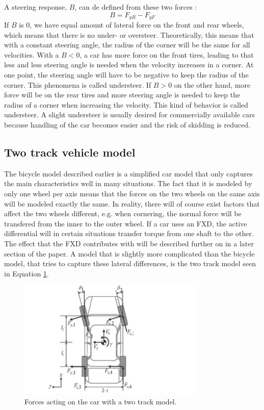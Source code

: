 A steering response, $ B $, can de defined from these two forces \cite{fordonsdynamik99}:
\begin{equation}
	B = F_{yR} - F_{yF}
\end{equation}
If $ B $ is 0, we have equal amount of lateral force on the front and rear wheels, which means that there is no under- or oversteer. Theoretically, this means that with a constant steering angle, the radius of the corner will be the same for all velocities. With a $ B < 0 $, a car has more force on the front tires, leading to that less and less steering angle is needed when the velocity increases in a corner. At one point, the steering angle will have to be negative to keep the radius of the corner. This phenomena is called understeer. If $ B > 0 $ on the other hand, more force will be on the rear tires and more steering angle is needed to keep the radius of a corner when increasing the velocity. This kind of behavior is called understeer. A slight understeer is usually desired for commercially available cars because handling of the car becomes easier and the risk of skidding is reduced.

\subsection{Two track vehicle model}

The bicycle model described earlier is a simplified car model that only captures the main characteristics well in many situations. The fact that it is modeled by only one wheel per axis means that the forces on the two wheels on the same axis will be modeled exactly the same. In reality, there will of course exist factors that affect the two wheels different, e.g. when cornering, the normal force will be transfered from the inner to the outer wheel. If a car uses an FXD, the active differential will in certain situations transfer torque from one shaft to the other. The effect that the FXD contributes with will be described further on in a later section of the paper. A model that is slightly more complicated than the bicycle model,  that tries to capture these lateral differences, is the two track model seen in Equation \ref{two_track_model}. 

\begin{figure}[h]
	\centering
	\includegraphics[width=0.8\textwidth]{Pictures/two_track_model}
	\caption{Forces acting on the car with a two track model.}
	\label{two_track_model}
\end{figure}

